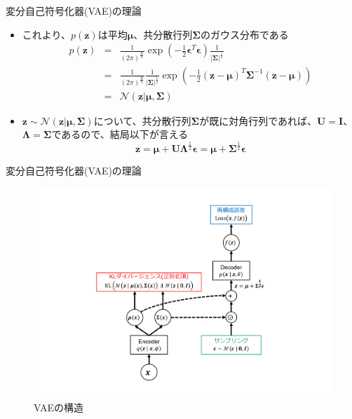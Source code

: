 \documentclass[dvipdfmx,notheorems,t]{beamer}
\begin{document}
\begin{frame}{変分自己符号化器(VAE)の理論}
\begin{itemize}
\begin{itemize}
		\item これより、$p(\bm{z})$は平均$\bm{\mu}$、共分散行列$\bm{\Sigma}$のガウス分布である
		\begin{eqnarray}
			p(\bm{z}) &=& \frac{1}{(2\pi)^\frac{K}{2}} \exp \left( -\frac{1}{2} \bm{\epsilon}^T \bm{\epsilon} \right) \frac{1}{|\bm{\Sigma}|^\frac{1}{2}} \nonumber \\
			&=& \frac{1}{(2\pi)^\frac{K}{2}} \frac{1}{|\bm{\Sigma}|^\frac{1}{2}} \exp \left( -\frac{1}{2} \left( \bm{z} - \bm{\mu} \right)^T \bm{\Sigma}^{-1} \left( \bm{z} - \bm{\mu} \right) \right) \\
			&=& \mathcal{N}(\bm{z} | \bm{\mu}, \bm{\Sigma})
		\end{eqnarray}
		
		\item $\bm{z} \sim \mathcal{N}(\bm{z} | \bm{\mu}, \bm{\Sigma})$について、共分散行列$\bm{\Sigma}$が既に対角行列であれば、$\bm{U} = \bm{I}$、$\bm{\Lambda} = \bm{\Sigma}$であるので、結局以下が言える
		\begin{equation}
			\bm{z} = \bm{\mu} + \bm{U} \bm{\Lambda}^\frac{1}{2} \bm{\epsilon} = \bm{\mu} + \bm{\Sigma}^\frac{1}{2} \bm{\epsilon}
		\end{equation}
	\end{itemize}
\end{itemize}

\end{frame}

\begin{frame}{変分自己符号化器(VAE)の理論}
	
\begin{figure}[h]
	\centering
	\includegraphics[keepaspectratio,scale=0.3,clip,trim=3cm 1cm 3cm 1cm]{vae-actual-architecture.pdf}
	\caption{VAEの構造}
	\label{fig:vae-actual-architecture}
\end{figure}

\end{frame}
\end{document}
